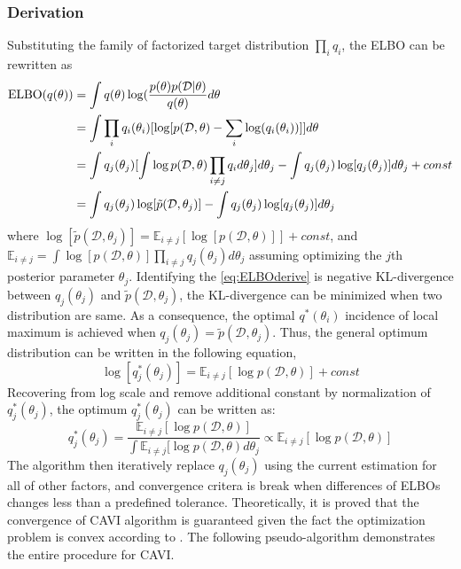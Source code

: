 \subsubsection{Derivation}
Substituting the family of factorized target distribution $\prod_i q_i$, the ELBO can be rewritten as 
\begin{equation}
	\label{eq:ELBOderive}	
	\begin{aligned}
		\textnormal{ELBO}(q(\theta)) &= \int q(\theta)\log(\frac{p(\theta)p(\mathcal{D}|\theta)}{q(\theta)}d\theta \\
		&= \int \prod_i q_i(\theta_i) [\log[p(\mathcal{D},\theta) - \sum_i \log(q_i(\theta_i))]]d\theta \\
		&= \int q_j(\theta_j)[\int \log p(\mathcal{D},\theta) \prod_{i\neq j}q_i d\theta_j]d\theta_j - \int q_j(\theta_j) \log[q_j(\theta_j)]d\theta_j + const\\
		&= \int q_j(\theta_j) \log[\tilde{p}(\mathcal{D},\theta_j)] - \int q_j(\theta_j) \log[q_j(\theta_j)]d\theta_j
	\end{aligned}
\end{equation}
where $\log[\tilde{p}(\mathcal{D},\theta_j)] = \mathbb{E}_{i \neq j}[\log[p(\mathcal{D},\theta)]] + const$, and $\mathbb{E}_{i\neq j} = \int \log[p(\mathcal{D},\theta)]\prod_{i\neq j}q_j(\theta_j)d\theta_j$ assuming optimizing the $j$th posterior parameter $\theta_j$.
Identifying the \ref{eq:ELBOderive} is negative KL-divergence between $q_j(\theta_j) $ and $\tilde{p}(\mathcal{D},\theta_j)$, the KL-divergence can be minimized when two distribution are same.
As a consequence, the optimal $q^{*}(\theta_i)$ incidence of local maximum is achieved when $q_j(\theta_j) = \tilde{p}(\mathcal{D},\theta_j)$. Thus, the general optimum distribution can be written in the following equation,
\begin{equation}
	\label{eq:logoptimumQ}
	\log[q_j^*(\theta_j)] = \mathbb{E}_{i\neq j}[\log p(\mathcal{D},\theta)] + const
\end{equation}
Recovering from log scale and remove additional constant by normalization of $q_j^*(\theta_j)$, the optimum $q_j^*(\theta_j)$ can be written as:
\begin{equation}
	q_j^*(\theta_j) = \frac{\mathbb{E}_{i\neq j}[\log p(\mathcal{D},\theta)]}{\int \mathbb{E}_{i\neq j}[\log p(\mathcal{D},\theta)d\theta_j} \propto \mathbb{E}_{i\neq j}[\log p(\mathcal{D},\theta)]
\end{equation}
The algorithm then iteratively replace $q_j(\theta_j)$ using the current estimation for all of other factors, and convergence critera is break when differences of ELBOs changes less than a predefined tolerance. Theoretically, it is proved that the convergence of CAVI algorithm is guaranteed given the fact the optimization problem is convex according to \cite{boyd2004convex}. The following pseudo-algorithm demonstrates the entire procedure for CAVI.

